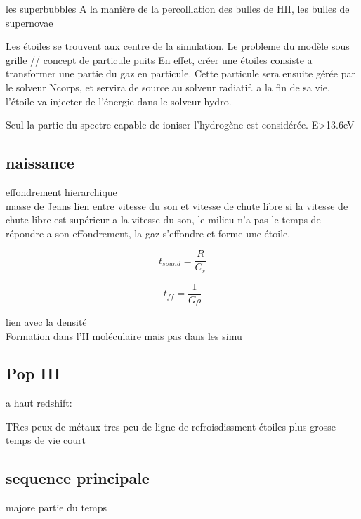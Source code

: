 les superbubbles
A la manière de la percolllation des bulles de HII, les bulles de supernovae 








Les étoiles se trouvent aux centre de la simulation.
Le probleme du modèle sous grille
// concept de particule puits 
En effet, créer une étoiles consiste a transformer une partie du gaz en particule.
Cette particule sera ensuite gérée par le solveur Ncorps, et servira de source au solveur radiatif.
a la fin de sa vie, l'étoile va injecter de l'énergie dans le solveur hydro.


Seul la partie du spectre capable de ioniser l'hydrogène est considérée. E>13.6eV

\subsection{naissance}
effondrement hierarchique\\

masse de Jeans
lien entre vitesse du son et vitesse de chute libre
si la vitesse de chute libre est supérieur a la vitesse du son, le milieu n'a pas le temps de répondre a son effondrement, la gaz s'effondre et forme une étoile.

\begin{equation}
t_{sound} = \frac{R}{C_s}
\end{equation}

\begin{equation}
t_{ff} = \frac{1}{G \rho}
\end{equation}




lien avec la densité\\

Formation dans l'H moléculaire mais pas dans les simu

\subsection{Pop III}


a haut redshift:

TRes peux de métaux
tres peu de ligne de refroisdissment
étoiles plus grosse
 temps de vie court




\subsection{sequence principale}
majore partie du temps\\

